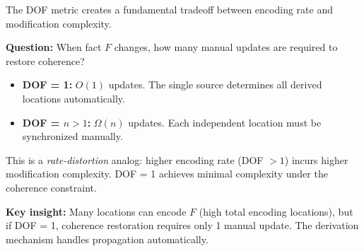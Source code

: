 The DOF metric creates a fundamental tradeoff between encoding rate and modification complexity.

\textbf{Question:} When fact $F$ changes, how many manual updates are required to restore coherence?

\begin{itemize}
\tightlist
\item \textbf{DOF = 1:} $O(1)$ updates. The single source determines all derived locations automatically.
\item \textbf{DOF = $n > 1$:} $\Omega(n)$ updates. Each independent location must be synchronized manually.
\end{itemize}

This is a \emph{rate-distortion} analog: higher encoding rate (DOF $> 1$) incurs higher modification complexity. DOF = 1 achieves minimal complexity under the coherence constraint.

\textbf{Key insight:} Many locations can encode $F$ (high total encoding locations), but if DOF = 1, coherence restoration requires only 1 manual update. The derivation mechanism handles propagation automatically.

